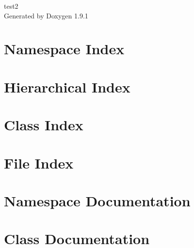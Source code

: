 \let\mypdfximage\pdfximage\def\pdfximage{\immediate\mypdfximage}\documentclass[twoside]{book}
\newcommand{\+}{\discretionary{\mbox{\scriptsize$\hookleftarrow$}}{}{}}
\newcommand{\clearemptydoublepage}{%
  \newpage{\pagestyle{empty}\cleardoublepage}%
}
\begin{document}
\raggedbottom

\hypersetup{pageanchor=false,
             bookmarksnumbered=true,
             pdfencoding=unicode
            }
\begin{titlepage}
\vspace*{7cm}
\begin{center}%
{\Large test2 }\\
\vspace*{1cm}
{\large Generated by Doxygen 1.9.1}\\
\end{center}
\end{titlepage}
\clearemptydoublepage
{}
\tableofcontents
\clearemptydoublepage
{}
\hypersetup{pageanchor=true}

\chapter{Namespace Index}

\chapter{Hierarchical Index}

\chapter{Class Index}

\chapter{File Index}

\chapter{Namespace Documentation}


\chapter{Class Documentation}





















\end{document}
